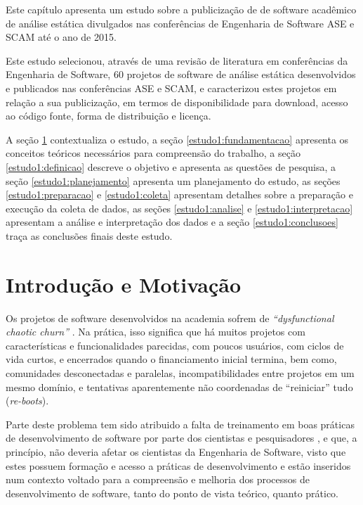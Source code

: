 {Este capítulo apresenta um estudo sobre a publicização de 
de software acadêmico de análise estática divulgados nas conferências de
Engenharia de Software ASE e SCAM até o ano de 2015.}
\label{estudo1}

Este estudo selecionou, através de uma revisão de literatura em conferências da
Engenharia de Software, 60 projetos de software de análise estática
desenvolvidos e publicados nas conferências ASE e SCAM, e caracterizou estes
projetos em relação a sua publicização, em termos de disponibilidade para
download, acesso ao código fonte, forma de distribuição e licença.

A seção \ref{estudo1:introducao} contextualiza o estudo,
a seção \ref{estudo1:fundamentacao} apresenta os conceitos teóricos necessários para compreensão do trabalho,
a seção \ref{estudo1:definicao} descreve o objetivo e apresenta as questões de pesquisa,
a seção \ref{estudo1:planejamento} apresenta um planejamento do estudo,
as seções \ref{estudo1:preparacao} e \ref{estudo1:coleta} apresentam detalhes sobre a preparação e execução da coleta de dados,
as seções \ref{estudo1:analise} e \ref{estudo1:interpretacao} apresentam a análise e interpretação dos dados e
a seção \ref{estudo1:conclusoes} traça as conclusões finais deste estudo.

\section{Introdução e Motivação} \label{estudo1:introducao} %

Os projetos de software desenvolvidos na academia sofrem de {\it
``dysfunctional chaotic churn''} \cite{howison2015understanding}.
Na prática, isso significa que há muitos projetos com características e
funcionalidades parecidas, com poucos usuários, com ciclos de vida curtos, e
encerrados quando o financiamento inicial termina, bem como, comunidades
desconectadas e paralelas, incompatibilidades entre projetos em um mesmo
domínio, e tentativas aparentemente não coordenadas de ``reiniciar'' tudo ({\it re-boots}). 
 
Parte deste problema tem sido atribuido a falta de treinamento em boas práticas
de desenvolvimento de software por parte dos cientistas e pesquisadores
\cite{wilson2017good}, e que, a princípio, não deveria afetar os cientistas da
Engenharia de Software, visto que estes possuem formação e acesso a práticas de
desenvolvimento e estão inseridos num contexto voltado para a compreensão e
melhoria dos processos de desenvolvimento de software, tanto do ponto de vista
teórico, quanto prático.

